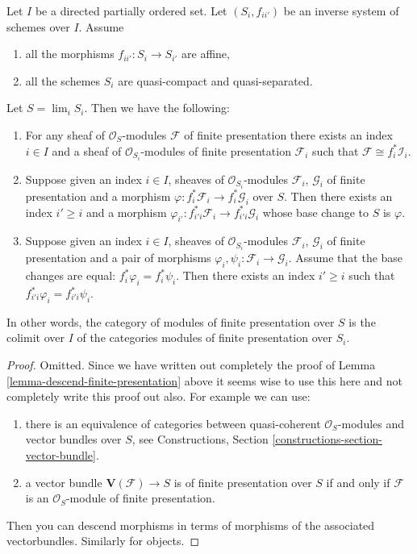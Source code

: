 \begin{lemma}
\label{lemma-descend-modules-finite-presentation}
Let $I$ be a directed partially ordered set.
Let $(S_i, f_{ii'})$ be an inverse system of schemes over $I$.
Assume
\begin{enumerate}
\item all the morphisms $f_{ii'} : S_i \to S_{i'}$ are affine,
\item all the schemes $S_i$ are quasi-compact and quasi-separated.
\end{enumerate}
Let $S = \lim_i S_i$. Then we have the following:
\begin{enumerate}
\item For any sheaf of $\mathcal{O}_S$-modules
$\mathcal{F}$ of finite presentation there exists an index
$i \in I$ and a sheaf of $\mathcal{O}_{S_i}$-modules of finite
presentation $\mathcal{F}_i$ such that
$\mathcal{F} \cong f_i^*\mathcal{I}_i$.
\item Suppose given an index $i \in I$, sheaves
of $\mathcal{O}_{S_i}$-modules $\mathcal{F}_i$, $\mathcal{G}_i$
of finite presentation and a morphism
$\varphi : f_i^*\mathcal{F}_i \to f_i^*\mathcal{G}_i$ over $S$.
Then there exists an index $i' \geq i$ and a morphism
$\varphi_{i'} : f_{i'i}^*\mathcal{F}_i \to f_{i'i}^*\mathcal{G}_i$
whose base change to $S$ is $\varphi$.
\item Suppose given an index $i \in I$, sheaves of $\mathcal{O}_{S_i}$-modules
$\mathcal{F}_i$, $\mathcal{G}_i$ of finite presentation
and a pair of morphisms $\varphi_i, \psi_i : \mathcal{F}_i \to \mathcal{G}_i$.
Assume that the base changes are equal: $f_i^*\varphi_i = f_i^*\psi_i$.
Then there exists an index $i' \geq i$ such that
$f_{i'i}^*\varphi_i = f_{i'i}^*\psi_i$.
\end{enumerate}
In other words, the category of modules
of finite presentation over $S$ is the colimit over $I$
of the categories modules of finite presentation over $S_i$.
\end{lemma}

\begin{proof}
Omitted. Since we have written out completely the proof of
Lemma \ref{lemma-descend-finite-presentation} above
it seems wise to use this here and not completely write this
proof out also. For example we can use:
\begin{enumerate}
\item there is an equivalence of categories
between quasi-coherent $\mathcal{O}_S$-modules and
vector bundles over $S$, see
Constructions, Section \ref{constructions-section-vector-bundle}.
\item a vector bundle $\mathbf{V}(\mathcal{F}) \to S$ is
of finite presentation over $S$ if and only if $\mathcal{F}$
is an $\mathcal{O}_S$-module of finite presentation.
\end{enumerate}
Then you can descend morphisms in terms of morphisms of the
associated vectorbundles. Similarly for objects.
\end{proof}

